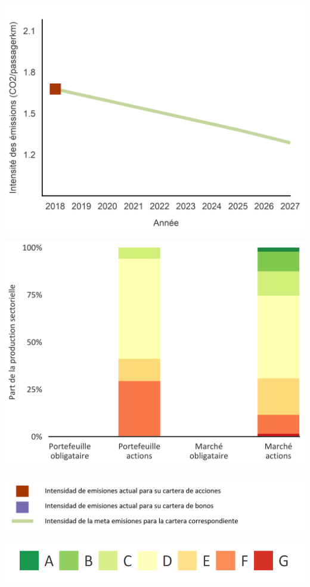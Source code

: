 \documentclass[10pt,table]{article}\usepackage[]{graphicx}\usepackage[]{color}
\begin{document}
	\begin{multicols}{2}
		
		\includegraphics[trim = {0 0 0 0pt}, width=.9\linewidth]{ReportOutputs/Fig32}  \vfill\null \columnbreak
		
		\includegraphics[width=1\linewidth]{ReportOutputs/Fig33}
		
	\end{multicols}
	
	\vspace{0pt}
	\setlength\multicolsep{0pt}
	
	\begin{multicols}{2}
		\includegraphics[width=1\linewidth]{ReportGraphics/OtherSectorLegend_ES}
		
		
		\begin{center}
			\includegraphics[width=0.6\linewidth]{ReportGraphics/ShippingLegend}
		\end{center}	
		
	\end{multicols}
	
\end{document}
